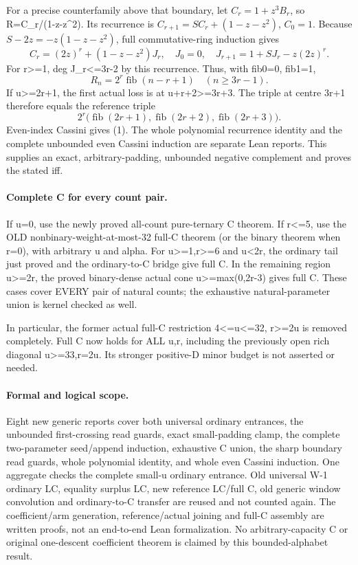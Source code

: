 For a precise counterfamily above that boundary, let
$C_r=1+z^3B_r$, so R=C_r/(1-z-z^2). Its recurrence is
$C_{r+1}=S C_r+(1-z-z^2)$, $C_0=1$.
Because $S-2z=-z(1-z-z^2)$, full commutative-ring induction gives
\[
             C_r=(2z)^r+(1-z-z^2)J_r,
\quad J_0=0,\quad J_{r+1}=1+S J_r-z(2z)^r.
\]
For r>=1, deg J_r<=3r-2 by this recurrence. Thus, with fib0=0,
fib1=1,
\[
             R_n=2^r\operatorname{fib}(n-r+1)
                                  \quad(n\ge3r-1).       \tag{5}
\]
If u>=2r+1, the first actual loss is at u+r+2>=3r+3.
The triple at centre 3r+1 therefore equals the reference triple
\[
 2^r\bigl(\operatorname{fib}(2r+1),
          \operatorname{fib}(2r+2),
          \operatorname{fib}(2r+3)\bigr).
\]
Even-index Cassini gives (1). The whole polynomial recurrence
identity and the complete unbounded even Cassini induction are
separate Lean reports. This supplies an exact, arbitrary-padding,
unbounded negative complement and proves the stated iff.

\paragraph{Complete C for every count pair.}
If u=0, use the newly proved all-count pure-ternary C theorem.
If r<=5, use the OLD nonbinary-weight-at-most-32 full-C theorem
(or the binary theorem when r=0), with arbitrary u and alpha.
For u>=1,r>=6 and u<2r, the ordinary tail just proved and the
ordinary-to-C bridge give full C. In the remaining region u>=2r,
the proved binary-dense actual cone u>=max(0,2r-3) gives full C.
These cases cover EVERY pair of natural counts; the exhaustive
natural-parameter union is kernel checked as well.

In particular, the former actual full-C restriction 4<=u<=32,
r>=2u is removed completely. Full C now holds for ALL u,r,
including the previously open rich diagonal u>=33,r=2u.
Its stronger positive-D minor budget is not asserted or needed.

\paragraph{Formal and logical scope.}
Eight new generic reports cover both universal ordinary entrances,
the unbounded first-crossing read guards, exact small-padding clamp,
the complete two-parameter seed/append induction, exhaustive C union,
the sharp boundary read guards, whole polynomial identity, and
whole even Cassini induction. One aggregate checks the complete
small-u ordinary entrance. Old universal W-1 ordinary LC, equality
surplus LC, new reference LC/full C, old generic window convolution
and ordinary-to-C transfer are reused and not counted again.
The coefficient/arm generation, reference/actual joining and full-C
assembly are written proofs, not an end-to-end Lean formalization.
No arbitrary-capacity C or original one-descent coefficient theorem
is claimed by this bounded-alphabet result.
